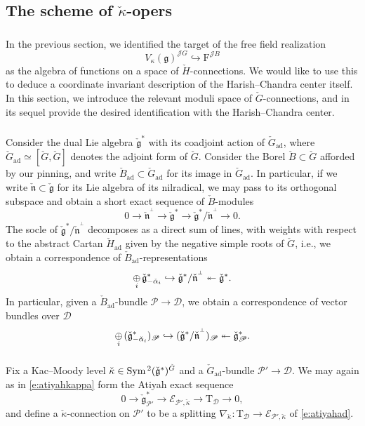 \documentclass{amsart}
\theoremstyle{definition}
\newcommand{\diglet}{\mathrm{F}}
\newcommand{\sss}{\subsubsection{}}
\newcommand{\fg}{\mathfrak{g}}
\newcommand{\sD}{\mathscr{D}}
\newcommand{\Sym}{\on{Sym}\hspace{.5mm}}
\newcommand{\on}{\mathrm}
\newcommand{\sP}{\mathscr{P}}
\newcommand{\Jet}{\mathscr{J}}
\newcommand{\ckappa}{\check{\kappa}}
\numberwithin{equation}{section}
\begin{document}
\subsection{The scheme of $\ckappa$-opers}
 \label{ss:kappaopers}
\sss In the previous section, we identified the target of the free field realization 
$$V_\kappa(\fg)^{\Jet G} \hookrightarrow \diglet^{\Jet B}$$
as the algebra of functions on a space of $\check{H}$-connections. We would like to use this to deduce a coordinate invariant description of the Harish--Chandra center itself. In this section, we introduce the relevant moduli space of $\check{G}$-connections, and in its sequel provide the desired identification with the Harish--Chandra center. 

\sss Consider the dual Lie algebra $\check{\fg}^*$ with its coadjoint action of $\check{G}_{\on{ad}}$, where $\check{G}_{\on{ad}} \simeq [\check{G}, \check{G}]$ denotes the adjoint form of $\check{G}$. Consider the Borel $\check{B} \subset \check{G}$ afforded by our pinning, and write $\check{B}_{\on{ad}} \subset \check{G}_{\on{ad}}$ for its image in $\check{G}_{\on{ad}}$. In particular, if we write $\check{\mathfrak{n}} \subset \check{\fg}$ for its Lie algebra of its nilradical, we may pass to its orthogonal subspace and obtain a short exact sequence of $\check{B}$-modules 
$$0 \rightarrow \check{\mathfrak{n}}^{{}^\perp} \rightarrow \check{\fg}^* \rightarrow \check{\fg}^*/\check{\mathfrak{n}}^{{}^\perp} \rightarrow 0.$$
The socle of $\check{\fg}^*/\check{\mathfrak{n}}^{{}^\perp}$ decomposes as a direct sum of lines, with weights with respect to the abstract Cartan $\check{H}_{\on{ad}}$ given by the negative simple roots of $\check{G}$, i.e., we obtain a correspondence of $\check{B}_{\on{ad}}$-representations 
$$\underset{i} \oplus \hspace{.5mm} \check{\fg}^*_{-\check{\alpha}_i} \hookrightarrow \check{\fg}^*/\check{\mathfrak{n}}^{{}^\perp} \twoheadleftarrow \check{\fg}^*.$$
In particular, given a $\check{B}_{\on{ad}}$-bundle $\sP \rightarrow \sD$, we obtain a correspondence of vector bundles over $\sD$
$$\underset{i} \oplus \hspace{.5mm} (\check{\fg}^*_{-\check{\alpha}_i})_{\sP} \hookrightarrow (\check{\fg}^*/\check{\mathfrak{n}}^{{}^\perp})_{\sP} \twoheadleftarrow \check{\fg}^*_{\sP}.$$



\sss{} Fix a Kac--Moody level ${\ckappa} \in \Sym^2( \check{\fg}^*)^{\check{G}}$ and a $\check{G}_\on{ad}$-bundle $\sP' \rightarrow \sD$. We may again as in \eqref{e:atiyahkappa} form the Atiyah exact sequence 
\begin{equation} \label{e:atiyahad}0 \rightarrow \check{\fg}^*_{\sP'} \rightarrow \mathscr{E}_{\sP', \ckappa} \rightarrow \on{T}_\sD \rightarrow 0,\end{equation}
and define a ${\ckappa}$-connection on $\sP'$ to be a splitting $\nabla_{\ckappa}: \on{T}_\sD \rightarrow \mathscr{E}_{\sP', \ckappa}$ of \eqref{e:atiyahad}.
\end{document}
